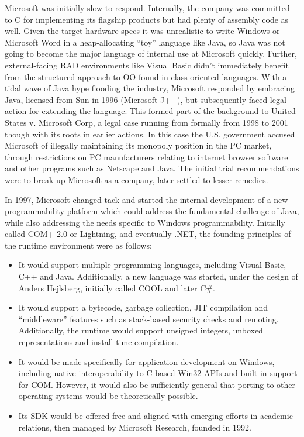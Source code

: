 \documentclass[acmsmall,screen]{acmart}
\begin{document}
Microsoft was initially slow to respond.  Internally, the company was committed to C for implementing its
flagship products but had plenty of assembly code as well. Given the target hardware specs it was unrealistic to write
Windows or Microsoft Word in a heap-allocating “toy” language like Java, so Java was not going to become the major
language of internal use at Microsoft quickly. Further, external-facing RAD environments like Visual Basic didn’t immediately
benefit from the structured approach to OO found in class-oriented languages. With a tidal wave of Java hype flooding
the industry, Microsoft responded by embracing Java, licensed from Sun in 1996 (Microsoft J++), but subsequently faced
legal action for extending the language. This formed part of the background to United States v. Microsoft Corp, a legal case
running from formally from 1998 to 2001 though with its roots in earlier actions. In this case the U.S. government accused
Microsoft of illegally maintaining its monopoly position in the PC market, through restrictions on PC manufacturers relating to
internet browser software and other programs such as Netscape and Java. The initial trial recommendations were to break-up Microsoft as a company, later settled to lesser remedies. 

In 1997, Microsoft changed tack and started the internal development of a new programmability platform which could
address the fundamental challenge of Java, while also addressing the needs specific to Windows programmability.  Initially
called COM+ 2.0 or Lightning, and eventually .NET, the founding principles of the runtime environment were as follows:
\begin{itemize}
\item It would support multiple programming languages, including Visual Basic, C++ and Java. Additionally, a new language was started, under the design of Anders Hejlsberg, initially called COOL and later C\#.
\item It would support a bytecode, garbage collection, JIT compilation and “middleware” features such as stack-based security checks and remoting. Additionally, the runtime would support unsigned integers, unboxed representations and install-time compilation.
\item It would be made specifically for application development on Windows, including native interoperability to C-based Win32 APIs and built-in support for COM. However, it would also be sufficiently general that porting to other operating systems would be theoretically possible.
\item Its SDK would be offered free and aligned with emerging efforts in academic relations, then managed by Microsoft Research, founded in 1992.
\end{itemize}
\end{document}
